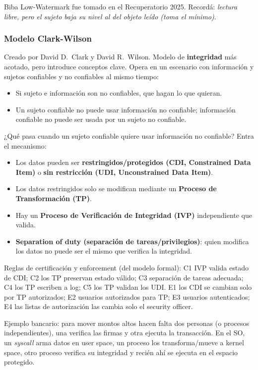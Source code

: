 \documentclass[../main.tex]{subfiles}
\begin{document}
\begin{examen}
Biba Low-Watermark fue tomado en el Recuperatorio 2025. Recordá: \emph{lectura libre, pero el sujeto baja su nivel al del objeto leído (toma el mínimo)}.
\end{examen}

\subsubsection{Modelo Clark-Wilson}

Creado por David D.\ Clark y David R.\ Wilson. Modelo de \textbf{integridad} más acotado, pero introduce conceptos clave. Opera en un escenario con información y sujetos confiables y no confiables al mismo tiempo:
\begin{itemize}[nosep]
  \item Si sujeto e información son no confiables, que hagan lo que quieran.
  \item Un sujeto confiable no puede usar información no confiable; información confiable no puede ser usada por un sujeto no confiable.
\end{itemize}

¿Qué pasa cuando un sujeto confiable quiere usar información no confiable? Entra el mecanismo:
\begin{itemize}[nosep]
  \item Los datos pueden ser \textbf{restringidos/protegidos (CDI, Constrained Data Item)} o \textbf{sin restricción (UDI, Unconstrained Data Item)}.
  \item Los datos restringidos solo se modifican mediante un \textbf{Proceso de Transformación (TP)}.
  \item Hay un \textbf{Proceso de Verificación de Integridad (IVP)} independiente que valida.
  \item \textbf{Separation of duty (separación de tareas/privilegios)}: quien modifica los datos no puede ser el mismo que verifica la integridad.
\end{itemize}

Reglas de certificación y enforcement (del modelo formal): C1 IVP valida estado de CDI; C2 los TP preservan estado válido; C3 separación de tareas adecuada; C4 los TP escriben a log; C5 los TP validan los UDI. E1 los CDI se cambian solo por TP autorizados; E2 usuarios autorizados para TP; E3 usuarios autenticados; E4 las listas de autorización las cambia solo el security officer.

\begin{destacado}
Ejemplo bancario: para mover montos altos hacen falta dos personas (o procesos independientes), una verifica las firmas y otra ejecuta la transacción. En el SO, un \emph{syscall} arma datos en user space, un proceso los transforma/mueve a kernel space, otro proceso verifica su integridad y recién ahí se ejecuta en el espacio protegido.
\end{destacado}
\end{document}
